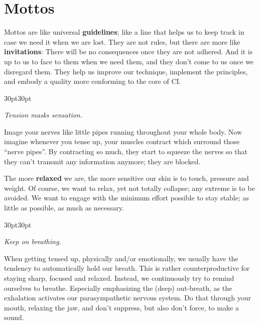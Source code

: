 \section{Mottos}\label{sec:mottos}

Mottos are like universal \textbf{guidelines}; like a line that helps us to keep track in case we need it when we are lost.
They are not rules, but there are more like \textbf{invitations}: There will be no consequences once they are not adhered.
And it is up to us to face to them when we need them, and they don't come to us once we disregard them.
They help us improve our technique, implement the principles, and embody a quality more conforming to the core of CI\@.


\newcommand{\motto}[1]{
    \vspace{5pt}
    \begin{adjustwidth}{30pt}{30pt}
    \begin{center}
    \textit{#1}
    \end{center}
    \end{adjustwidth}
}

\motto{Tension masks sensation.}

Image your nerves like little pipes running throughout your whole body.
Now imagine whenever you tense up, your muscles contract which surround those ``nerve pipes''.
By contracting so much, they start to squeeze the nerves so that they can't transmit any information anymore; they are blocked.

The more \textbf{relaxed} we are, the more sensitive our skin is to touch, pressure and weight.
Of course, we want to relax, yet not totally collapse; any extreme is to be avoided.
We want to engage with the minimum effort possible to stay stable; as little as possible, as much as necessary.

\motto{Keep on breathing.}
When getting tensed up, physically and/or emotionally, we usually have the tendency to automatically hold our breath.
This is rather counterproductive for staying sharp, focused and relaxed.
Instead, we continuously try to remind ourselves to breathe.
Especially emphasizing the (deep) out-breath, as the exhalation activates our parasympathetic nervous system.
Do that through your mouth, relaxing the jaw, and don't suppress, but also don't force, to make a sound.

